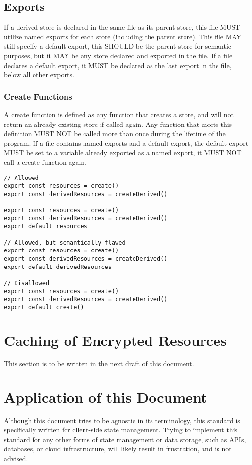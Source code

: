 \documentclass{article}
\begin{document}
\subsection{Exports}
If a derived store is declared in the same file as its parent store, this file MUST utilize named exports for each store (including the parent store). This file MAY still specify a default export, this SHOULD be the parent store for semantic purposes, but it MAY be any store declared and exported in the file. If a file declares a default export, it MUST be declared as the last export in the file, below all other exports.

\subsubsection{Create Functions}
A create function is defined as any function that creates a store, and will not return an already existing store if called again. Any function that meets this definition MUST NOT be called more than once during the lifetime of the program. If a file contains named exports and a default export, the default export MUST be set to a variable already exported as a named export, it MUST NOT call a create function again. 

\begin{lstlisting}[caption=Usage of Create Functions and Named Exports]
// Allowed
export const resources = create()
export const derivedResources = createDerived()

export const resources = create()
export const derivedResources = createDerived()
export default resources

// Allowed, but semantically flawed
export const resources = create()
export const derivedResources = createDerived()
export default derivedResources

// Disallowed
export const resources = create()
export const derivedResources = createDerived()
export default create()
\end{lstlisting}

\section{Caching of Encrypted Resources}
This section is to be written in the next draft of this document.

\newpage
\section{Application of this Document}
Although this document tries to be agnostic in its terminology, this standard is specifically written for client-side state management. Trying to implement this standard for any other forms of state management or data storage, such as APIs, databases, or cloud infrastructure, will likely result in frustration, and is not advised. 
\end{document}

